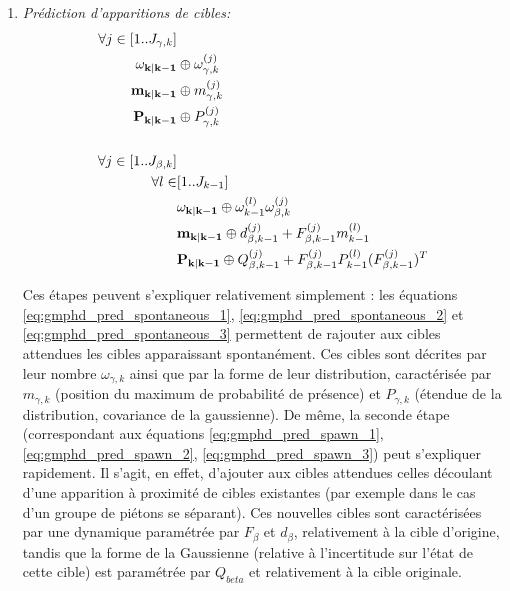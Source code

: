\begin{enumerate}
	\item{\emph{Prédiction d'apparitions de cibles:}}
		\begin{align}
			\forall j \in [1 .. J_{\gamma, k}]& 							\notag 	\\
					\mathbf{\omega_{k|k-1}} 	&\oplus \omega_{\gamma, k}^{(j)}	\label{eq:gmphd_pred_spontaneous_1}\\
					\mathbf{m_{k|k-1}} 			&\oplus m_{\gamma, k}^{(j)} 		\label{eq:gmphd_pred_spontaneous_2}\\
					\mathbf{P_{k|k-1}} 			&\oplus P_{\gamma, k}^{(j)} 		\label{eq:gmphd_pred_spontaneous_3}\\ 
					\notag \\
			\forall j \in [1 .. J_{\beta, k}]& 		\notag	\\
				\forall l \in &[1 .. J_{k-1}] 		\notag	\\
						&\mathbf{\omega_{k|k-1}} 	\oplus \omega_{k-1}^{(l)} \omega_{\beta, k}^{(j)}					\label{eq:gmphd_pred_spawn_1}\\
						&\mathbf{m_{k|k-1}} 		\oplus d_{\beta, k-1}^{(j)} + F_{\beta, k-1}^{(j)} m_{k-1}^{(l)} 	\label{eq:gmphd_pred_spawn_2}\\
						&\mathbf{P_{k|k-1}} 		\oplus Q_{\beta, k-1}^{(j)} + F_{\beta, k-1}^{(j)} P_{k-1}^{(l)} (F_{\beta, k-1}^{(j)})^T \label{eq:gmphd_pred_spawn_3}
		\end{align}
		
		Ces étapes peuvent s'expliquer relativement simplement : les équations \ref{eq:gmphd_pred_spontaneous_1}, \ref{eq:gmphd_pred_spontaneous_2} et \ref{eq:gmphd_pred_spontaneous_3} permettent de rajouter aux cibles attendues les cibles apparaissant spontanément. Ces cibles sont décrites par leur nombre $\omega_{\gamma, k}$ ainsi que par la forme de leur distribution, caractérisée par $m_{\gamma, k}$ (position du maximum de probabilité de présence) et $P_{\gamma, k}$ (étendue de la distribution, covariance de la gaussienne). 
		De même, la seconde étape (correspondant aux équations \ref{eq:gmphd_pred_spawn_1}, \ref{eq:gmphd_pred_spawn_2}, \ref{eq:gmphd_pred_spawn_3}) peut s'expliquer rapidement. Il s'agit, en effet, d'ajouter aux cibles attendues celles découlant d'une apparition à proximité de cibles existantes (par exemple dans le cas d'un groupe de piétons se séparant). Ces nouvelles cibles sont caractérisées par une dynamique paramétrée par $F_\beta$ et $d_\beta$, relativement à la cible d'origine, tandis que la forme de la Gaussienne (relative à l'incertitude sur l'état de cette cible) est paramétrée par $Q_{beta}$ et relativement à la cible originale. \newline
		

\end{enumerate}
